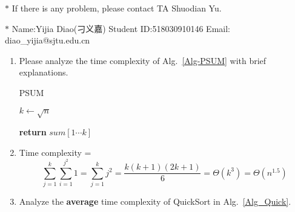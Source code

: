 \documentclass[12pt,a4paper,UTF8]{article}
\makeatletter
\newtheorem*{solution}{Solution}
\theoremstyle{definition}
\renewenvironment{solution}[1][Solution] {\par\pushQED{\qed}\normalfont\topsep6\p@\@plus6\p@\relax\trivlist\item[\hskip\labelsep\bfseries#1\@addpunct{.}]\ignorespaces}{\popQED\endtrivlist\@endpefalse} \makeatother
\makeatother
\begin{document}
\noindent

\noindent{}
\begin{center}
\footnotesize{\color{red}$*$ If there is any problem, please contact TA Shuodian Yu.}

\footnotesize{\color{blue}$*$ Name:Yijia Diao(刁义嘉)  \quad Student ID:518030910146 \quad Email: diao\_yijia@sjtu.edu.cn}
\end{center}

\begin{enumerate}
    \item
    Please analyze the time complexity of Alg.~\ref{Alg-PSUM} with brief explanations.

    \begin{minipage}[t]{0.8\textwidth}
    \begin{algorithm}[H]
        \caption{PSUM}\label{Alg-PSUM}

        \BlankLine

        $k \leftarrow \sqrt{n}$\;


        {\bf return} $sum[1\cdots k]$\;
    \end{algorithm}
    \end{minipage}

    \begin{solution}
        Time complexity = 
        $$\sum_{j = 1}^k \sum_{i = 1}^{j^2} 1 = \sum_{j = 1}^k j^2 = \frac{k(k+1)(2k+1)}{6} = \Theta(k^3) = \Theta(n^{1.5})$$
    \end{solution}

    \item
    Analyze the \textbf{average} time complexity of QuickSort in Alg.~\ref{Alg_Quick}.

    \begin{minipage}[t]{0.8\textwidth}
    \begin{algorithm}[H]


\end{algorithm}
\end{minipage}
\end{enumerate}
\end{document}
